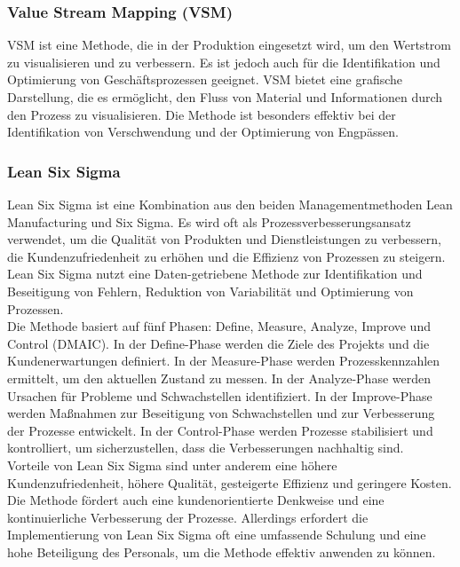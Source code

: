 \documentclass[11pt,a4paper]{scrartcl}
\begin{document}
\subsubsection{Value Stream Mapping (VSM)}

VSM ist eine Methode, die in der Produktion eingesetzt wird, um den Wertstrom zu visualisieren und zu verbessern.
Es ist jedoch auch für die Identifikation und Optimierung von Geschäftsprozessen geeignet.
VSM bietet eine grafische Darstellung, die es ermöglicht, den Fluss von Material und Informationen durch den Prozess zu visualisieren.
Die Methode ist besonders effektiv bei der Identifikation von Verschwendung und der Optimierung von Engpässen.

\subsubsection{Lean Six Sigma}

Lean Six Sigma ist eine Kombination aus den beiden Managementmethoden Lean Manufacturing und Six Sigma.
Es wird oft als Prozessverbesserungsansatz verwendet, um die Qualität von Produkten und Dienstleistungen zu verbessern, die Kundenzufriedenheit zu erhöhen und die Effizienz von Prozessen zu steigern.
Lean Six Sigma nutzt eine Daten-getriebene Methode zur Identifikation und Beseitigung von Fehlern, Reduktion von Variabilität und Optimierung von Prozessen.\\

Die Methode basiert auf fünf Phasen: Define, Measure, Analyze, Improve und Control (DMAIC).
In der Define-Phase werden die Ziele des Projekts und die Kundenerwartungen definiert.
In der Measure-Phase werden Prozesskennzahlen ermittelt, um den aktuellen Zustand zu messen.
In der Analyze-Phase werden Ursachen für Probleme und Schwachstellen identifiziert.
In der Improve-Phase werden Maßnahmen zur Beseitigung von Schwachstellen und zur Verbesserung der Prozesse entwickelt.
In der Control-Phase werden Prozesse stabilisiert und kontrolliert, um sicherzustellen, dass die Verbesserungen nachhaltig sind.\\

Vorteile von Lean Six Sigma sind unter anderem eine höhere Kundenzufriedenheit, höhere Qualität, gesteigerte Effizienz und geringere Kosten.
Die Methode fördert auch eine kundenorientierte Denkweise und eine kontinuierliche Verbesserung der Prozesse.
Allerdings erfordert die Implementierung von Lean Six Sigma oft eine umfassende Schulung und eine hohe Beteiligung des Personals, um die Methode effektiv anwenden zu können.\\
\end{document}
